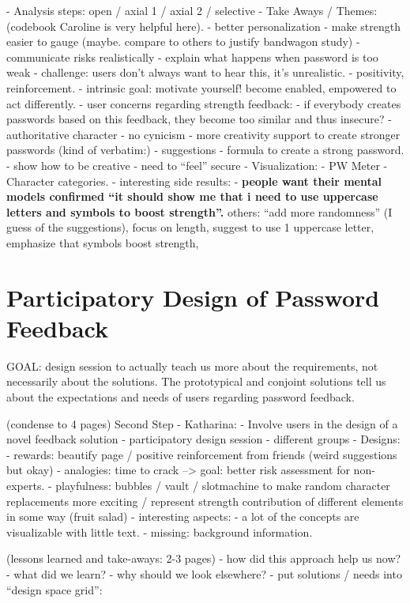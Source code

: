 - Analysis steps: open / axial 1 / axial 2 / selective
- Take Aways / Themes: (codebook Caroline is very helpful here).
	- better personalization
	- make strength easier to gauge (maybe. compare to others to justify bandwagon study)
		- communicate risks realistically
		- explain what happens when password is too weak
			- challenge: users don't always want to hear this, it's unrealistic.
			- positivity, reinforcement.
			- intrinsic goal: motivate yourself! become enabled, empowered to act differently.
	- user concerns regarding strength feedback:
		- if everybody creates passwords based on this feedback, they become too similar and thus insecure?
		- authoritative character
		- no cynicism
	- more creativity support to create stronger passwords (kind of verbatim:)
		- suggestions
		- formula to create a strong password. 
		- show how to be creative 
		- need to ``feel'' secure
	- Visualization:
		- PW Meter
		- Character categories.
	- interesting side results: 
		- \textbf{people want their mental models confirmed ``it should show me that i need to use uppercase letters and symbols to boost strength''.} others: ``add more randomness'' (I guess of the suggestions), focus on length, suggest to use 1 uppercase letter, emphasize that symbols boost strength, 
		
\section{Participatory Design of Password Feedback}
GOAL: design session to actually teach us more about the requirements, not necessarily about the solutions. The prototypical and conjoint solutions tell us about the expectations and needs of users regarding password feedback. 

(condense to 4 pages)
Second Step - Katharina: 
- Involve users in the design of a novel feedback solution
	- participatory design session
	- different groups
- Designs:
	- rewards: beautify page / positive reinforcement from friends (weird suggestions but okay)
	- analogies: time to crack --> goal: better risk assessment for non-experts.
	- playfulness: bubbles / vault / slotmachine to make random character replacements more exciting / represent strength contribution of different elements in some way (fruit salad)
- interesting aspects:
	- a lot of the concepts are visualizable with little text.
	- missing: background information.
	
(lessons learned and take-aways: 2-3 pages)
- how did this approach help us now?
- what did we learn?
- why should we look elsewhere?
- put solutions / needs into ``design space grid'':



